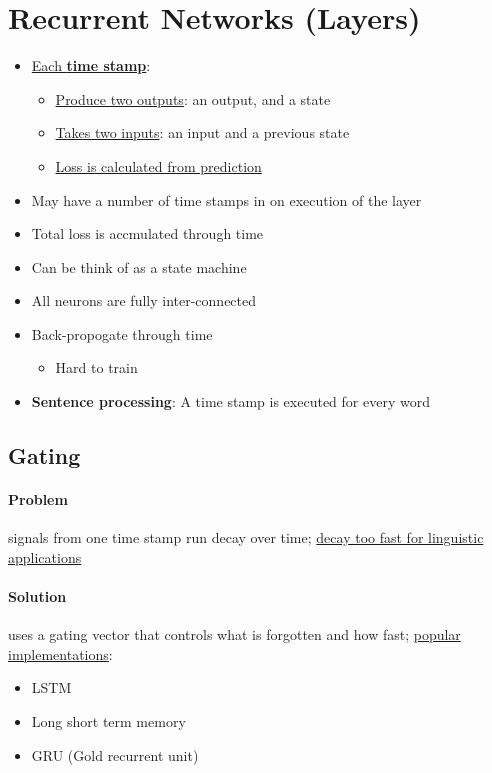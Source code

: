 \section{Recurrent Networks (Layers)}

  \begin{itemize}
    \item \ul{Each \textbf{time stamp}}:
    \begin{itemize}
      \item \ul{Produce two outputs}: an output, and a state
      \item \ul{Takes two inputs}: an input and a previous state
      \item \ul{Loss is calculated from prediction}
    \end{itemize}

    \item May have a number of time stamps in on execution of the layer
    \item Total loss is accmulated through time
    \item Can be think of as a state machine
    \item All neurons are fully inter-connected
    \item Back-propogate through time
    \begin{itemize}
      \item Hard to train
    \end{itemize}

    \item \textbf{Sentence processing}: A time stamp is executed
    for every word
  \end{itemize}

  \subsection{Gating}

    \paragraph{Problem} signals from one time stamp run decay over time;
    \ul{decay too fast for linguistic applications}

    \paragraph{Solution} uses a gating vector that controls what is
    forgotten and how fast; \ul{popular implementations}:
    \begin{itemize}
      \item LSTM
      \item Long short term memory
      \item GRU (Gold recurrent unit)
    \end{itemize}

